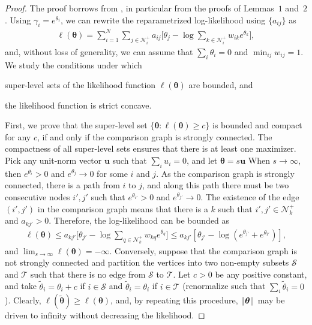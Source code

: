 \begin{proof}
The proof borrows from \citet{hunter2004mm}, in particular from the proofs of Lemmas~$1$ and~$2$.
Using $\gamma_i = e^{\theta_i}$, we can rewrite the reparametrized log-likelihood using $\{ a_{ij} \}$ as
\begin{align*}
    \ell(\bm{\theta})
        = \sum_{i = 1}^N \sum_{j \in \mathcal{N}^+_i} a_{ij} \bigg[ \theta_j - \log \sum_{k \in \mathcal{N}^+_i} w_{ik} e^{\theta_k} \bigg],
\end{align*}
and, without loss of generality, we can assume that $\sum_i \theta_i = 0$ and $\min_{ij} w_{ij} = 1$.
We study the conditions under which
\begin{enuminline}
\item super-level sets of the likelihood function $\ell(\bm{\theta})$ are bounded, and
\item the likelihood function is strict concave.
\end{enuminline}

First, we prove that the super-level set $\{ \bm{\theta} : \ell(\bm{\theta}) \ge c \}$ is bounded and compact for any $c$, if and only if the comparison graph is strongly connected.
The compactness of all super-level sets ensures that there is at least one maximizer.
Pick any unit-norm vector $\bm{u}$ such that $\sum_i u_i = 0$, and let $\bm{\theta} = s \bm{u}$
When $s \to \infty$, then $e^{\theta_i} > 0$ and $e^{\theta_j} \to 0 $ for some $i$ and $j$.
As the comparison graph is strongly connected, there is a path from $i$ to $j$, and along this path there must be two consecutive nodes $i', j'$ such that $e^{\theta_{i'}} > 0$ and $e^{\theta_{j'}} \to 0$.
The existence of the edge $(i',j')$ in the comparison graph means that there is a $k$ such that $i', j' \in \mathcal{N}^+_k$ and $a_{kj'} > 0$.
Therefore, the log-likelihood can be bounded as
\begin{align*}
\ell(\bm{\theta})
    \le a_{kj'} \bigg[ \theta_{j'} - \log \sum_{q \in \mathcal{N}^+_k} w_{kq} e^{\theta_q} \bigg]
    \le a_{kj'} \left[ \theta_{j'} - \log (e^{\theta_{j'}} + e^{\theta_{i'}}) \right],
\end{align*}
and $\lim_{s \to \infty} \ell(\bm{\theta}) = -\infty$.
Conversely, suppose that the comparison graph is not strongly connected and partition the vertices into two non-empty subsets $\mathcal{S}$ and $\mathcal{T}$ such that there is no edge from $\mathcal{S}$ to $\mathcal{T}$.
Let $c > 0$ be any positive constant, and take $\tilde{\theta}_i = \theta_i + c$ if $i \in \mathcal{S}$ and $\tilde{\theta}_i = \theta_i$ if $i \in \mathcal{T}$ (renormalize such that $\sum_i \tilde{\theta}_i = 0$).
Clearly, $\ell(\tilde{\bm{\theta}}) \ge \ell(\bm{\theta})$, and, by repeating this procedure, $\lVert\bm{\theta}\rVert$ may be driven to infinity without decreasing the likelihood.


\end{proof}
